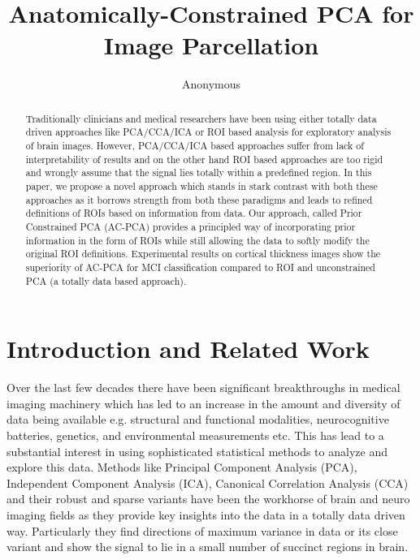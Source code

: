 \documentclass{llncs}
\begin{document}
\vspace{-0.1in}
\title{Anatomically-Constrained PCA for Image Parcellation}
\author{Anonymous}
\maketitle              
\begin{abstract}
 Traditionally clinicians and medical researchers have been using either totally data driven approaches like PCA/CCA/ICA or ROI based analysis for exploratory analysis of brain images. However, PCA/CCA/ICA based approaches suffer from lack of interpretability of results and on the other hand ROI based approaches are too rigid and wrongly assume that the signal lies totally within a predefined region. In this paper, we propose a novel approach which stands in stark contrast with both these approaches as it borrows strength from both these paradigms and leads to refined definitions of ROIs based on information from data. Our approach, called Prior Constrained PCA (AC-PCA) provides a principled way of incorporating prior information in the form of ROIs while still allowing the data to softly modify the original ROI definitions. Experimental results on cortical thickness images show the superiority of AC-PCA for MCI classification compared to ROI and unconstrained PCA (a totally data based approach). 

\end{abstract}

\section{Introduction and Related Work}
Over the last  few decades there have been significant breakthroughs in medical imaging machinery which has led to an increase in the amount and diversity of data being available e.g. structural and functional modalities, neurocognitive batteries, genetics, and environmental measurements etc. This has lead to a substantial interest in using sophisticated statistical methods to analyze and explore this data. Methods like Principal Component Analysis (PCA), Independent Component Analysis (ICA), Canonical Correlation Analysis (CCA) and their robust and sparse variants have been the workhorse of brain and neuro imaging fields as they provide key insights into the data in a totally data driven way. Particularly they find directions of maximum variance in data or its close variant and show the signal to lie in a small number of succinct regions in brain. 
\end{document}
